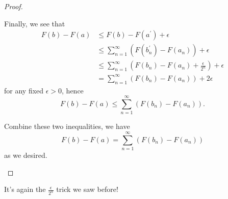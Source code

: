 \begin{proof}
\begin{enumerate}
\begin{itemize}
			            Finally, we see that
			            \[
				            \begin{split}
					            F(b) - F(a)&\leq F(b) - F(a ^\prime )+\epsilon \\
					            &\leq \sum\limits_{n=1}^{\infty} \left(F(b_{n} ^\prime ) - F(a_{n})\right) + \epsilon \\
					            &\leq \sum\limits_{n=1}^{\infty} \left(F(b_{n}) - F(a_{n}) + \frac{\epsilon }{2^n}\right) + \epsilon\\
					            &= \sum\limits_{n=1}^{\infty} \left(F(b_{n}) - F(a_{n})\right) + 2\epsilon
				            \end{split}
			            \]
			            for any fixed \(\epsilon > 0\), hence
			            \[
				            F(b) - F(a) \leq \sum\limits_{n=1}^{\infty} (F(b_{n}) - F(a_{n})).
			            \]
		      \end{itemize}
		      Combine these two inequalities, we have
		      \[
			      F(b) - F(a) = \sum\limits_{n=1}^{\infty} (F(b_{n}) - F(a_{n}))
		      \]
		      as we desired.
	\end{enumerate}
\end{proof}
\begin{remark}
	It's again the \(\frac{\epsilon}{2^n}\) trick we saw before!
\end{remark}